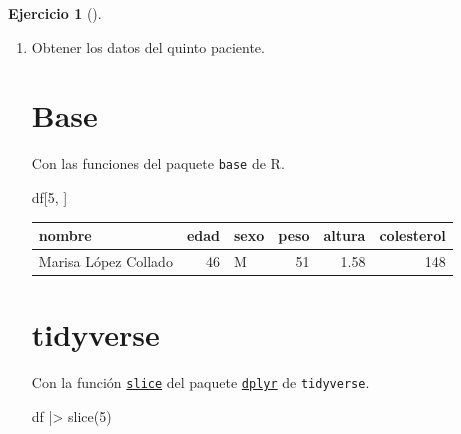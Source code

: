 \documentclass[
  spanish,
  a4paper,
]{scrreport}
\newenvironment{Shaded}{\begin{snugshade}}{\end{snugshade}}
\newcommand{\DecValTok}[1]{\textcolor[rgb]{0.68,0.00,0.00}{#1}}
\newcommand{\FunctionTok}[1]{\textcolor[rgb]{0.28,0.35,0.67}{#1}}
\newcommand{\NormalTok}[1]{\textcolor[rgb]{0.00,0.23,0.31}{#1}}
\newcommand{\SpecialCharTok}[1]{\textcolor[rgb]{0.37,0.37,0.37}{#1}}
\theoremstyle{definition}
\newtheorem{exercise}{Ejercicio}[chapter]
\theoremstyle{remark}
\begin{document}
\begin{exercise}[]
\begin{enumerate}
\begin{tcolorbox}
  \end{tcolorbox}
\item
  Obtener los datos del quinto paciente.

  \begin{tcolorbox}[enhanced jigsaw, breakable, leftrule=.75mm, toptitle=1mm, rightrule=.15mm, opacitybacktitle=0.6, left=2mm, colframe=quarto-callout-tip-color-frame, titlerule=0mm, toprule=.15mm, opacityback=0, bottomtitle=1mm, coltitle=black, colbacktitle=quarto-callout-tip-color!10!white, title=\textcolor{quarto-callout-tip-color}{\faLightbulb}\hspace{0.5em}{Solución}, arc=.35mm, bottomrule=.15mm, colback=white]

  \section{Base}

  Con las funciones del paquete \texttt{base} de R.

\begin{Shaded}
\begin{Highlighting}[]
\NormalTok{df[}\DecValTok{5}\NormalTok{, ]}
\end{Highlighting}
\end{Shaded}

  \begin{longtable}[]{@{}lrlrrr@{}}
  \toprule\noalign{}
  nombre & edad & sexo & peso & altura & colesterol \\
  \midrule\noalign{}
  \endhead
  \bottomrule\noalign{}
  \endlastfoot
  Marisa López Collado & 46 & M & 51 & 1.58 & 148 \\
  \end{longtable}

  \section{tidyverse}

  Con la función
  \href{https://dplyr.tidyverse.org/reference/slice.html}{\texttt{slice}}
  del paquete
  \href{https://dplyr.tidyverse.org/index.html}{\texttt{dplyr}} de
  \texttt{tidyverse}.

\begin{Shaded}
\begin{Highlighting}[]
\NormalTok{df }\SpecialCharTok{|\textgreater{}} \FunctionTok{slice}\NormalTok{(}\DecValTok{5}\NormalTok{)}
\end{Highlighting}
\end{Shaded}


\end{tcolorbox}
\end{enumerate}
\end{exercise}
\end{document}
